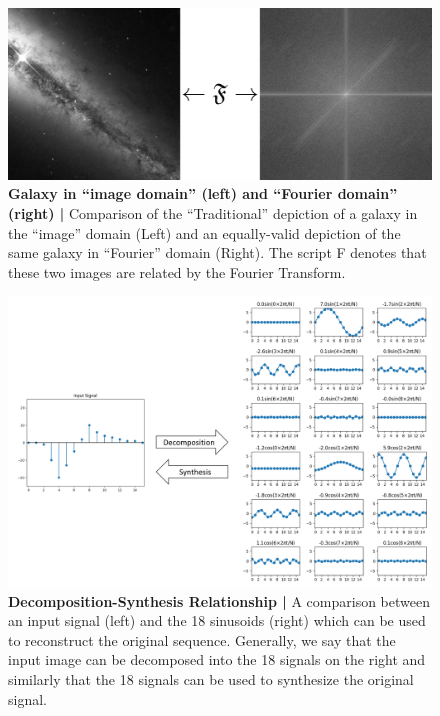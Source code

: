 \documentclass[12pt,a4paper]{article}
\author{Devin Cody}
\begin{document}
\begin{figure}
\centering
\includegraphics[width=\textwidth]{_images/FT.png}
\caption{\textbf{Galaxy in ``image domain'' (left) and ``Fourier domain'' (right) |} Comparison of the ``Traditional'' depiction of a galaxy in the ``image'' domain (Left) and an equally-valid depiction of the same galaxy in “Fourier” domain (Right). The script F denotes that these two images are related by the Fourier Transform.}
\end{figure}


\begin{figure}
\centering
\includegraphics[width=\textwidth]{_images/DecompSynth.png}
\caption{\textbf{ Decomposition-Synthesis Relationship |} A comparison between an input signal (left) and the 18 sinusoids (right) which can be used to reconstruct the original sequence. Generally, we say that the input image can be decomposed into the 18 signals on the right and similarly that the 18 signals can be used to synthesize the original signal. 
}\label{fig:deco}
\end{figure}
\end{document}
